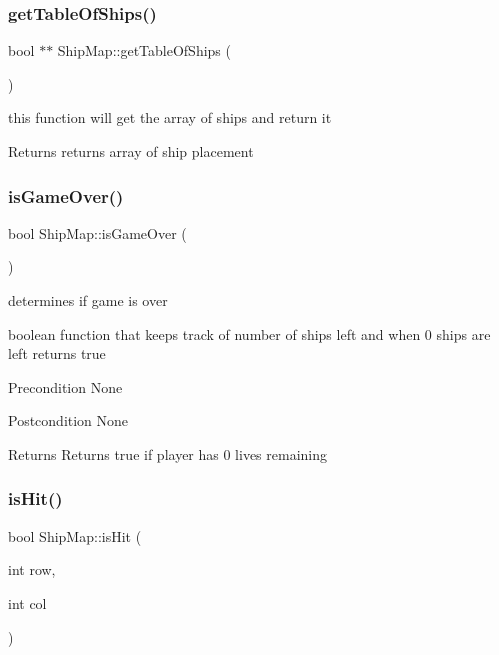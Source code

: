 \subsubsection{\texorpdfstring{get\+Table\+Of\+Ships()}{getTableOfShips()}}
{\footnotesize\ttfamily bool $\ast$$\ast$ Ship\+Map\+::get\+Table\+Of\+Ships (\begin{DoxyParamCaption}{ }\end{DoxyParamCaption})}

this function will get the array of ships and return it \begin{DoxyReturn}{Returns}
returns array of ship placement 
\end{DoxyReturn}
\mbox{\label{classShipMap_a6dbc6a05cdc3ff75bf43f66b9a23fd47}} 
\subsubsection{\texorpdfstring{is\+Game\+Over()}{isGameOver()}}
{\footnotesize\ttfamily bool Ship\+Map\+::is\+Game\+Over (\begin{DoxyParamCaption}{ }\end{DoxyParamCaption})}

determines if game is over

boolean function that keeps track of number of ships left and when 0 ships are left returns true \begin{DoxyPrecond}{Precondition}
None 
\end{DoxyPrecond}
\begin{DoxyPostcond}{Postcondition}
None 
\end{DoxyPostcond}
\begin{DoxyReturn}{Returns}
Returns true if player has 0 lives remaining 
\end{DoxyReturn}
\mbox{\label{classShipMap_acbcf28e008f8852cba70071dbd01d3d7}} 
\subsubsection{\texorpdfstring{is\+Hit()}{isHit()}}
{\footnotesize\ttfamily bool Ship\+Map\+::is\+Hit (\begin{DoxyParamCaption}\item[{int}]{row,  }\item[{int}]{col }\end{DoxyParamCaption})}

